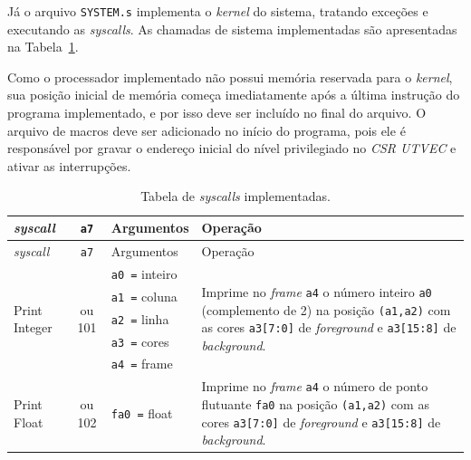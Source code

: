     { Já o arquivo \texttt{SYSTEM.s} implementa o \textit{kernel} do sistema,
        tratando exceções e executando as \textit{syscalls}. As chamadas de
        sistema implementadas são apresentadas na Tabela~\ref{table:syscalls}.
    }

    { Como o processador implementado não possui memória reservada para o
        \textit{kernel}, sua posição inicial de memória começa imediatamente
        após a última instrução do programa implementado, e por isso deve ser
        incluído no final do arquivo. O arquivo de macros deve ser adicionado
        no início do programa, pois ele é responsável por gravar o endereço inicial
        do nível privilegiado no \textit{CSR UTVEC} e ativar as interrupções.
    }

    \begin{longtable}{|l|c|p{3cm}|l |}
        \caption{Tabela de \textit{syscalls} implementadas.}\label{table:syscalls}\\
        \hline
        \textit{syscall}                    & \texttt{a7}             & Argumentos                & Operação\\*
        \hline
        \endfirsthead
        \hline
        \textit{syscall}                    & \texttt{a7}             & Argumentos                & Operação\\*
        \hline
        \endhead
        \multirow{5}{*}{Print Integer}      & \multirow{5}{*}{\parbox{0.6cm}{ ou 101}}
              & \texttt{a0 =} inteiro     & \multirow{5}{*}{\parbox{7cm}{Imprime no \textit{frame} \texttt{a4} o número inteiro \texttt{a0} (complemento de 2) na
                                                posição \texttt{(a1,a2)} com as cores \texttt{a3[7:0]} de \textit{foreground} e \texttt{a3[15:8]} de \textit{background}.}}\\*
            & & \texttt{a1 =} coluna      & \\*
            & & \texttt{a2 =} linha       & \\*
            & & \texttt{a3 =} cores       & \\*
            & & \texttt{a4 =} frame       & \\
        \hline
        \multirow{5}{*}{Print Float}        & \multirow{5}{*}{\parbox{0.6cm}{ ou 102}}
              & \texttt{fa0 =} float      & \multirow{5}{*}{\parbox{7cm}{Imprime no \textit{frame} \texttt{a4} o número de ponto flutuante \texttt{fa0} na
                                                posição \texttt{(a1,a2)} com as cores \texttt{a3[7:0]} de \textit{foreground} e \texttt{a3[15:8]} de \textit{background}.}}\\*

\end{longtable}
